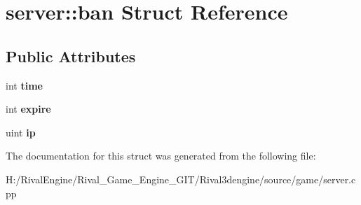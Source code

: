 \hypertarget{structserver_1_1ban}{}\section{server\+:\+:ban Struct Reference}
\label{structserver_1_1ban}
\subsection*{Public Attributes}
\begin{DoxyCompactItemize}
\item 
\mbox{\label{structserver_1_1ban_a653c006117b93552d3853b960f35ec3d}} 
int {\bfseries time}
\item 
\mbox{\label{structserver_1_1ban_a0efeeede4a4a729ccba246145ad8ddcf}} 
int {\bfseries expire}
\item 
\mbox{\label{structserver_1_1ban_affcd760617a9e58ebf99483ee8a690c7}} 
uint {\bfseries ip}
\end{DoxyCompactItemize}


The documentation for this struct was generated from the following file\+:\begin{DoxyCompactItemize}
\item 
H\+:/\+Rival\+Engine/\+Rival\+\_\+\+Game\+\_\+\+Engine\+\_\+\+G\+I\+T/\+Rival3dengine/source/game/server.\+cpp\end{DoxyCompactItemize}

